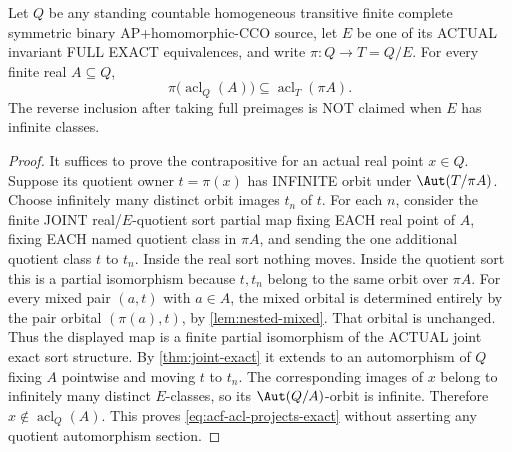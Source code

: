 

\begin{lemma}
\label{lem:acf-acl-projects-exact}
Let \(Q\) be any standing countable
homogeneous transitive finite complete
symmetric binary AP+homomorphic-CCO
source, let \(E\) be one of its ACTUAL
invariant FULL EXACT equivalences,
and write \(\pi:Q\to T=Q/E\).
For every finite real \(A\subseteq Q\),
\[
 \boxed{\qquad
 \pi\bigl(\operatorname{acl}_Q(A)\bigr)
       \subseteq
       \operatorname{acl}_{T}(\pi A).
 \qquad}
\tag{APJ}\label{eq:acf-acl-projects-exact}
\]
The reverse inclusion after taking
full preimages is NOT claimed when
\(E\) has infinite classes.
\end{lemma}
\begin{proof}
It suffices to prove the
contrapositive for an actual
real point \(x\in Q\).
Suppose its quotient owner
\(t=\pi(x)\) has INFINITE orbit
under \(\Aut(T/\pi A)\).
Choose infinitely many distinct
orbit images \(t_n\) of \(t\).
For each \(n\), consider
the finite JOINT real/\(E\)-quotient
sort partial map fixing EACH
real point of \(A\), fixing
EACH named quotient class
in \(\pi A\), and sending
the one additional quotient
class \(t\) to \(t_n\).
Inside the real sort
nothing moves. Inside the
quotient sort this is a
partial isomorphism because
\(t,t_n\) belong to the
same orbit over \(\pi A\).
For every mixed pair
\((a,t)\) with \(a\in A\),
the mixed orbital is
determined entirely by
the pair orbital
\((\pi(a),t)\), by
\cref{lem:nested-mixed}.
That orbital is unchanged.
Thus the displayed map is
a finite partial isomorphism
of the ACTUAL joint exact
sort structure. By
\cref{thm:joint-exact}
it extends to an automorphism
of \(Q\) fixing \(A\)
pointwise and moving \(t\)
to \(t_n\).
The corresponding images
of \(x\) belong to
infinitely many distinct
\(E\)-classes, so its
\(\Aut(Q/A)\)-orbit is
infinite. Therefore
\(x\notin\operatorname{acl}_Q(A)\).
This proves \eqref{eq:acf-acl-projects-exact}
without asserting any quotient
automorphism section.
\end{proof}

